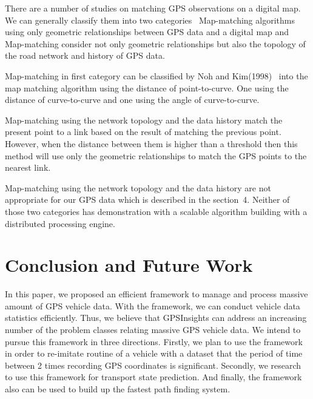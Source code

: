 \documentclass{acm_proc_article-sp}
\begin{document}
There are a number of studies on matching GPS observations on a digital map. We can generally classify them into two categories~\cite{yang2005map} Map-matching algorithms using only geometric relationships between GPS data and a digital map and Map-matching consider not only geometric relationships but also the topology of the road network and history of GPS data.
		
		\setlength{\parindent}{0.7cm} Map-matching in first category can be classified by Noh and Kim(1998)~\cite{noh1998map} into the map matching algorithm using the distance of point-to-curve. One using the distance of curve-to-curve and one using the angle of curve-to-curve.
		
		\setlength{\parindent}{0.7cm} Map-matching using the network topology and the data history match the present point to a link based on the result of matching the previous point. However, when the distance between them is higher than a threshold then this method will use only the geometric relationships to match the GPS points to the nearest link.
		
		\setlength{\parindent}{0.7cm} Map-matching using the network topology and the data history are not appropriate for our GPS data which is described in the section~4. Neither of those two categories has demonstration with a scalable algorithm building with a distributed processing engine. 
			
	\section{Conclusion and Future Work}
	In this paper, we proposed an efficient framework to manage and process massive amount of GPS vehicle data. With the framework, we can conduct vehicle data statistics efficiently. Thus, we believe that GPSInsights can address an increasing number of the problem classes relating massive GPS vehicle data. We intend to pursue this framework in three directions. Firstly, we plan to use the framework in order to re-imitate routine of a vehicle with a dataset that the period of time between 2 times recording GPS coordinates is significant. Secondly, we research to use this framework for transport state prediction. And finally, the framework also can be used to build up the fastest path finding system.
			

%

%
%
\appendix
\end{document}
